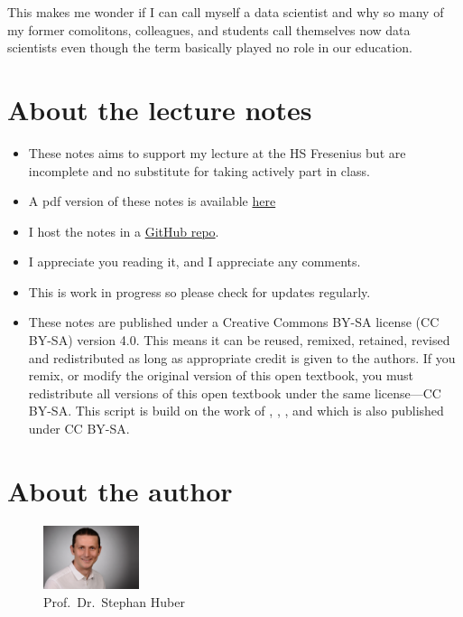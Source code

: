 \documentclass[
  12pt,
  oneside]{book}
\providecommand{\tightlist}{%
  \setlength{\itemsep}{0pt}\setlength{\parskip}{0pt}}
\theoremstyle{definition}
\theoremstyle{definition}
\theoremstyle{definition}
\theoremstyle{definition}
\theoremstyle{remark}
\begin{document}
This makes me wonder if I can call myself a data scientist and why so many of my former comolitons, colleagues, and students call themselves now data scientists even though the term basically played no role in our education.

\hypertarget{about-the-lecture-notes}{%
\section*{About the lecture notes}\label{about-the-lecture-notes}}

\begin{itemize}
\tightlist
\item
  These notes aims to support my lecture at the HS Fresenius but are incomplete and no substitute for taking actively part in class.
\item
  A pdf version of these notes is available \href{https://raw.githubusercontent.com/hubchev/hubchev.github.io/main/ds/_main.pdf}{here}
\item
  I host the notes in a \href{https://github.com/hubchev/hubchev.github.io/tree/main/ds}{GitHub repo}.
\item
  I appreciate you reading it, and I appreciate any comments.
\item
  This is work in progress so please check for updates regularly.
\item
  These notes are published under a Creative Commons BY-SA license (CC BY-SA) version 4.0. This means it can be reused, remixed, retained, revised and redistributed as long as appropriate credit is given to the authors. If you remix, or modify the original version of this open textbook, you must redistribute all versions of this open textbook under the same license---CC BY-SA. This script is build on the work of \citet{Navarro2020Learning}, \citet{Muschelli2022Introduction}, \citet{Thulin2021Modern}, and \citet{Ismay2022Statistical} which is also published under CC BY-SA.
\end{itemize}

\hypertarget{about-the-author}{%
\section*{About the author}\label{about-the-author}}

\begin{figure}
\centering
\includegraphics[width=0.25\textwidth,height=\textheight]{fig/huber2.jpeg}
\caption{\label{fig:itsme} Prof.~Dr.~Stephan Huber}
\end{figure}
\end{document}
